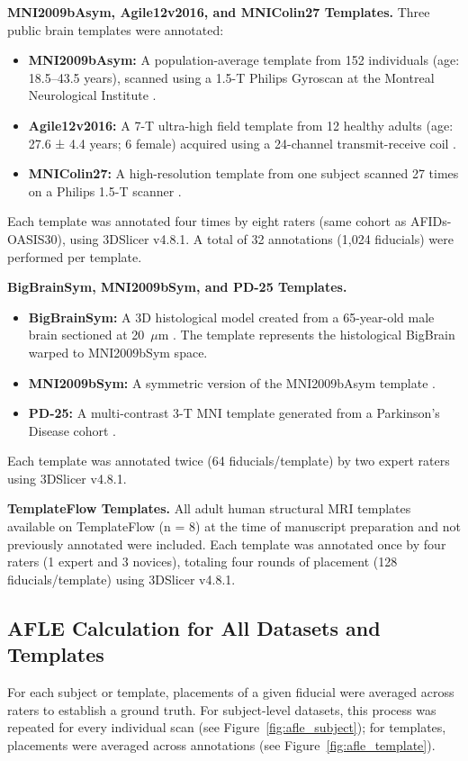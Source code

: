 \textbf{MNI2009bAsym, Agile12v2016, and MNIColin27 Templates.} Three public brain templates were annotated:
\begin{itemize}
    \item \textbf{MNI2009bAsym:} A population-average template from 152 individuals (age: 18.5–43.5 years), scanned using a 1.5-T Philips Gyroscan at the Montreal Neurological Institute \cite{Fonov2009-oi}.
    \item \textbf{Agile12v2016:} A 7-T ultra-high field template from 12 healthy adults (age: 27.6 ± 4.4 years; 6 female) acquired using a 24-channel transmit-receive coil \cite{Lau2017-ea}.
    \item \textbf{MNIColin27:} A high-resolution template from one subject scanned 27 times on a Philips 1.5-T scanner \cite{Collins1994-dx}.
\end{itemize}

Each template was annotated four times by eight raters (same cohort as AFIDs-OASIS30), using 3DSlicer v4.8.1. A total of 32 annotations (1,024 fiducials) were performed per template.

\textbf{BigBrainSym, MNI2009bSym, and PD-25 Templates.}
\begin{itemize}
    \item \textbf{BigBrainSym:} A 3D histological model created from a 65-year-old male brain sectioned at 20~$\mu$m \cite{Amunts2013-vu}. The template represents the histological BigBrain warped to MNI2009bSym space.
    \item \textbf{MNI2009bSym:} A symmetric version of the MNI2009bAsym template \cite{Fonov2009-oi}.
    \item \textbf{PD-25:} A multi-contrast 3-T MNI template generated from a Parkinson's Disease cohort \cite{Xiao2017-zp}.
\end{itemize}

Each template was annotated twice (64 fiducials/template) by two expert raters using 3DSlicer v4.8.1.

\textbf{TemplateFlow Templates.} All adult human structural MRI templates available on TemplateFlow (n = 8) at the time of manuscript preparation and not previously annotated were included\cite{Ciric2022-bo}. Each template was annotated once by four raters (1 expert and 3 novices), totaling four rounds of placement (128 fiducials/template) using 3DSlicer v4.8.1.

\subsection{AFLE Calculation for All Datasets and Templates}
For each subject or template, placements of a given fiducial were averaged across raters to establish a ground truth. For subject-level datasets, this process was repeated for every individual scan (see Figure~\ref{fig:afle_subject}); for templates, placements were averaged across annotations (see Figure~\ref{fig:afle_template}).

